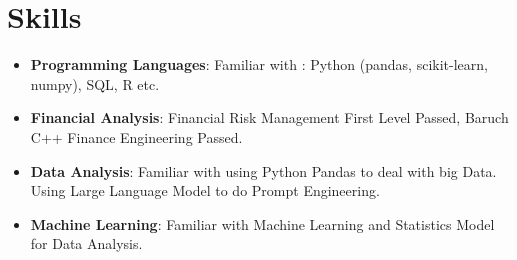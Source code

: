 \documentclass{resume}
\newcommand{\en}[1]{#1}
\newcommand{\zh}[1]{}
\begin{document}
\section{\en{Skills}\zh{技能}}
\begin{itemize}[parsep=0.25ex]
      \item \en{\textbf{Programming Languages}:
                  Familiar with : Python (pandas, scikit-learn, numpy), SQL, R etc.}
      \item \en{\textbf{Financial Analysis}:
                  Financial Risk Management First Level Passed, Baruch C++ Finance Engineering Passed.}

      \item \en{\textbf{Data Analysis}: Familiar with using Python Pandas to deal with big Data. Using Large Language Model to do Prompt Engineering.}

      \item \en{\textbf{Machine Learning}:
            Familiar with Machine Learning and Statistics Model for Data Analysis.}
            \zh{\textbf{机器学习}:
                  熟悉经典机器学习算法。}
           

\end{itemize}

           
           
           
           
\end{document}
